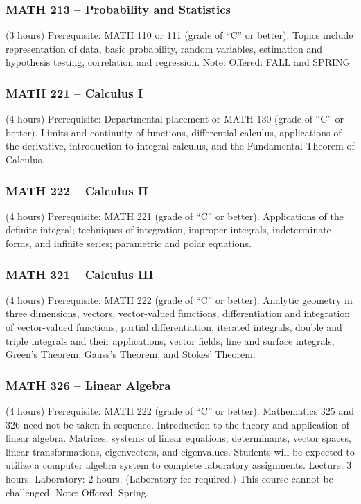 \subsubsection{MATH 213 -- Probability and Statistics}
(3 hours) Prerequisite: MATH 110 or 111 (grade of “C” or better). Topics include representation of data, basic probability, random variables, estimation and hypothesis testing, correlation and regression. Note: Offered: FALL and SPRING

\subsubsection{MATH 221 -- Calculus I}
(4 hours) Prerequisite: Departmental placement or MATH 130 (grade of “C” or better). Limits and continuity of functions, differential calculus, applications of the derivative, introduction to integral calculus, and the Fundamental Theorem of Calculus.

\subsubsection{MATH 222 -- Calculus II}
(4 hours) Prerequisite: MATH 221 (grade of “C” or better). Applications of the definite integral; techniques of integration, improper integrals, indeterminate forms, and infinite series; parametric and polar equations.

\subsubsection{MATH 321 -- Calculus III}
(4 hours) Prerequisite: MATH 222 (grade of “C” or better). Analytic geometry in three dimensions, vectors, vector-valued functions, differentiation and integration of vector-valued functions, partial differentiation, iterated integrals, double and triple integrals and their applications, vector fields, line and surface integrals, Green’s Theorem, Gauss’s Theorem, and Stokes’ Theorem.

\subsubsection{MATH 326 -- Linear Algebra}
(4 hours) Prerequisite: MATH 222 (grade of “C” or better). Mathematics 325 and 326 need not be taken in sequence. Introduction to the theory and application of linear algebra. Matrices, systems of linear equations, determinants, vector spaces, linear transformations, eigenvectors, and eigenvalues. Students will be expected to utilize a computer algebra system to complete laboratory assignments. Lecture: 3 hours. Laboratory: 2 hours. (Laboratory fee required.) This course cannot be challenged. Note: Offered: Spring.

